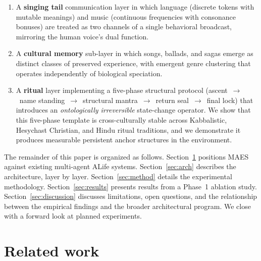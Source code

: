 \documentclass[11pt,a4paper]{article}
\begin{document}
\begin{enumerate}
\item A \textbf{singing tail} communication layer in which language
      (discrete tokens with mutable meanings) and music (continuous
      frequencies with consonance bonuses) are treated as two channels
      of a single behavioral broadcast, mirroring the human voice's
      dual function.

\item A \textbf{cultural memory} sub-layer in which songs, ballads, and
      sagas emerge as distinct classes of preserved experience, with
      emergent genre clustering that operates independently of biological
      speciation.

\item A \textbf{ritual} layer implementing a five-phase structural
      protocol (ascent~$\rightarrow$~name standing~$\rightarrow$~structural
      mantra~$\rightarrow$~return seal~$\rightarrow$~final lock) that
      introduces an \emph{ontologically irreversible} state-change
      operator. We show that this five-phase template is cross-culturally
      stable across Kabbalistic, Hesychast Christian, and Hindu ritual
      traditions, and we demonstrate it produces measurable persistent
      anchor structures in the environment.
\end{enumerate}

The remainder of this paper is organized as follows. Section~\ref{sec:related}
positions MAES against existing multi-agent ALife systems. Section~\ref{sec:arch}
describes the architecture, layer by layer. Section~\ref{sec:method}
details the experimental methodology. Section~\ref{sec:results} presents
results from a Phase~1 ablation study. Section~\ref{sec:discussion}
discusses limitations, open questions, and the relationship between the
empirical findings and the broader architectural program. We close with a
forward look at planned experiments.

\section{Related work}
\label{sec:related}
\end{document}
